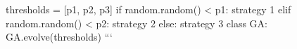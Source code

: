 \markdownRendererInterblockSeparator
{}thresholds = [p1, p2, p3] if random.random() < p1: \markdownRendererHash{} strategy 1\markdownRendererEllipsis{} elif random.random() < p2: \markdownRendererHash{} strategy 2\markdownRendererEllipsis{} else: \markdownRendererHash{} strategy 3\markdownRendererEllipsis{}\markdownRendererInterblockSeparator
{}class GA: \markdownRendererEllipsis{}\markdownRendererInterblockSeparator
{}GA.evolve(thresholds) ```\relax